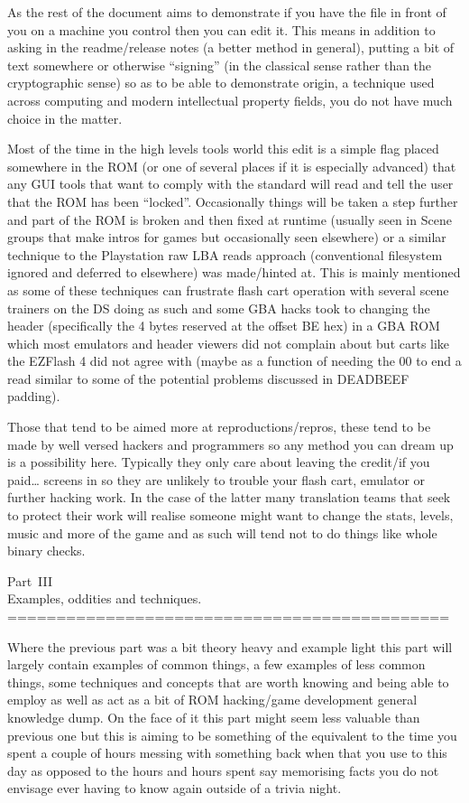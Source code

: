 \documentclass[
]{book}
\begin{document}
As the rest of the document aims to demonstrate if you have the file in front of you on a machine you control then you can edit it. This means in addition to asking in the readme/release notes (a better method in general), putting a bit of text somewhere or otherwise ``signing'' (in the classical sense rather than the cryptographic sense) so as to be able to demonstrate origin, a technique used across computing and modern intellectual property fields, you do not have much choice in the matter.

Most of the time in the high levels tools world this edit is a simple flag placed somewhere in the ROM (or one of several places if it is especially advanced) that any GUI tools that want to comply with the standard will read and tell the user that the ROM has been ``locked''. Occasionally things will be taken a step further and part of the ROM is broken and then fixed at runtime (usually seen in Scene groups that make intros for games but occasionally seen elsewhere) or a similar technique to the Playstation raw LBA reads approach (conventional filesystem ignored and deferred to elsewhere) was made/hinted at. This is mainly mentioned as some of these techniques can frustrate flash cart operation with several scene trainers on the DS doing as such and some GBA hacks took to changing the header (specifically the 4 bytes reserved at the offset BE hex) in a GBA ROM which most emulators and header viewers did not complain about but carts like the EZFlash 4 did not agree with (maybe as a function of needing the 00 to end a read similar to some of the potential problems discussed in DEADBEEF padding).

Those that tend to be aimed more at reproductions/repros, these tend to be made by well versed hackers and programmers so any method you can dream up is a possibility here. Typically they only care about leaving the credit/if you paid\ldots{} screens in so they are unlikely to trouble your flash cart, emulator or further hacking work. In the case of the latter many translation teams that seek to protect their work will realise someone might want to change the stats, levels, music and more of the game and as such will tend not to do things like whole binary checks.

Part~III\\
Examples, oddities and techniques.
=============================================

Where the previous part was a bit theory heavy and example light this part will largely contain examples of common things, a few examples of less common things, some techniques and concepts that are worth knowing and being able to employ as well as act as a bit of ROM hacking/game development general knowledge dump. On the face of it this part might seem less valuable than previous one but this is aiming to be something of the equivalent to the time you spent a couple of hours messing with something back when that you use to this day as opposed to the hours and hours spent say memorising facts you do not envisage ever having to know again outside of a trivia night.
\end{document}

